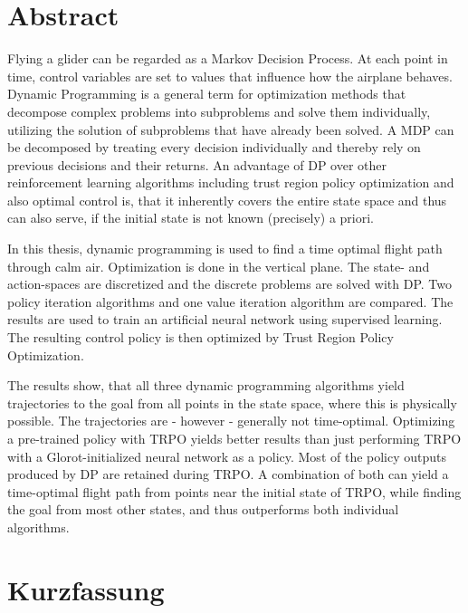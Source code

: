 

\section*{Abstract}

Flying a glider can be regarded as a Markov Decision Process. At each point in time, control variables are set to values that influence how the airplane behaves. Dynamic Programming is a general term for optimization methods that decompose complex problems into subproblems and solve them individually, utilizing the solution of subproblems that have already been solved. A MDP can be decomposed by treating every decision individually and thereby rely on previous decisions and their returns. An advantage of DP over other reinforcement learning algorithms including trust region policy optimization and also optimal control is, that it inherently covers the entire state space and thus can also serve, if the initial state is not known (precisely) a priori.

In this thesis, dynamic programming is used to find a time optimal flight path through calm air. Optimization is done in the vertical plane. The state- and action-spaces are discretized and the discrete problems are solved with DP. Two policy iteration algorithms and one value iteration algorithm are compared. The results are used to train an artificial neural network using supervised learning. The resulting control policy is then optimized by Trust Region Policy Optimization.

The results show, that all three dynamic programming algorithms yield trajectories to the goal from all points in the state space, where this is physically possible. The trajectories are - however - generally not time-optimal. Optimizing a pre-trained policy with TRPO yields better results than just performing TRPO with a Glorot-initialized neural network as a policy. Most of the policy outputs produced by DP are retained during TRPO. A combination of both can yield a time-optimal flight path from points near the initial state of TRPO, while finding the goal from most other states, and thus outperforms both individual algorithms.
\newpage
\section*{Kurzfassung}

